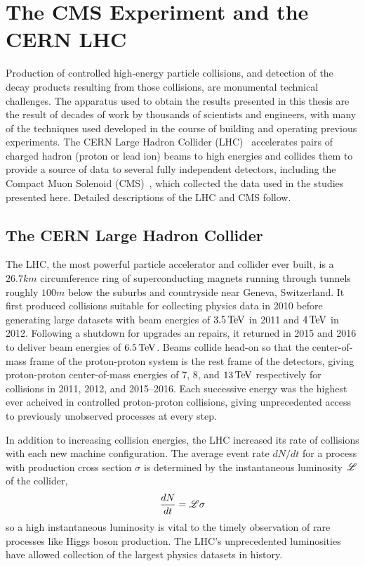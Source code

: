 
\chapter{The CMS Experiment and the CERN LHC}
Production of controlled high-energy particle collisions, and detection of the decay products resulting from those collisions, are monumental technical challenges. The apparatus used to obtain the results presented in this thesis are the result of decades of work by thousands of scientists and engineers, with many of the techniques used developed in the course of building and operating previous experiments. The CERN Large Hadron Collider (LHC)~\cite{Evans:2008zzb,Bruning2012705} accelerates pairs of charged hadron (proton or lead ion) beams to high energies and collides them to provide a source of data to several fully independent detectors, including the Compact Muon Solenoid (CMS)~\cite{Chatrchyan:2008zzk}, which collected the data used in the studies presented here. Detailed descriptions of the LHC and CMS follow.



\section{The CERN Large Hadron Collider}
The LHC, the most powerful particle accelerator and collider ever built, is a $26.7\unit{km}$ circumference ring of superconducting magnets running through tunnels roughly $100\unit{m}$ below the suburbs and countryside near Geneva, Switzerland. It first produced collisions suitable for collecting physics data in 2010 before generating large datasets with beam energies of $3.5\,\mathrm{Te\hspace{-.08em}V}$ in 2011 and $4\,\mathrm{Te\hspace{-.08em}V}$ in 2012. Following a shutdown for upgrades an repairs, it returned in 2015 and 2016 to deliver beam energies of $6.5\,\mathrm{Te\hspace{-.08em}V}$. Beams collide head-on so that the center-of-mass frame of the proton-proton system is the rest frame of the detectors, giving proton-proton center-of-mass energies of 7, 8, and $13\,\mathrm{Te\hspace{-.08em}V}$ respectively for collisions in 2011, 2012, and 2015--2016. Each successive energy was the highest ever acheived in controlled proton-proton collisions, giving unprecedented access to previously unobserved processes at every step.

In addition to increasing collision energies, the LHC increased its rate of collisions with each new machine configuration. The average event rate $dN / dt$ for a process with production cross section $\sigma$ is determined by the instantaneous luminosity $\mathscr{L}$ of the collider,
\begin{equation}
  \frac{dN}{dt} = \mathscr{L}\sigma
\end{equation}
so a high instantaneous luminosity is vital to the timely observation of rare processes like Higgs boson production. The LHC's unprecedented luminosities have allowed collection of the largest physics datasets in history.

